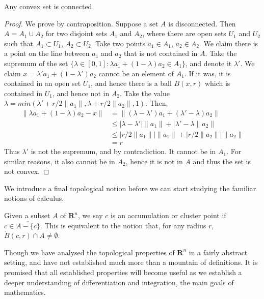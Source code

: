 \begin{theorem}
  Any convex set is connected.
\end{theorem}
\begin{proof}
  We prove by contraposition. Suppose a set $A$ is disconnected. Then $A = A_1 \cup A_2$ for two disjoint sets $A_1$ and $A_2$, where there are open sets $U_1$ and $U_2$ such that $A_1 \subset U_1$, $A_2 \subset U_2$. Take two points $a_1 \in A_1$, $a_2 \in A_2$. We claim there is a point on the line between $a_1$ and $a_2$ that is not contained in $A$. Take the supremum of the set $\{ \lambda \in [0,1] : \lambda a_1 + (1 - \lambda) a_2 \in A_1 \}$, and denote it $\lambda'$. We claim $x = \lambda' a_1 + (1 - \lambda') a_2$ cannot be an element of $A_1$. If it was, it is contained in an open set $U_1$, and hence there is a ball $B(x,r)$ which is contained in $U_1$, and hence not in $A_2$. Take the value $\lambda = min(\lambda' + r/2\|a_1\|, \lambda + r/2\|a_2\|, 1)$. Then,
  \begin{align*}
  \| \lambda a_1 + (1 - \lambda) a_2 - x \| &= \| (\lambda - \lambda') a_1 + (\lambda' - \lambda) a_2 \|\\
      &\leq |\lambda - \lambda'| \| a_1 \| + |\lambda' - \lambda \|a_2\|\\
      &\leq |r/2\|a_1\|| \|a_1\| + |r/2\|a_2\|| \|a_2\|\\
      &= r
  \end{align*}
  Thus $\lambda'$ is not the supremum, and by contradiction. It cannot be in $A_1$. For similar reasons, it also cannot be in $A_2$, hence it is not in $A$ and thus the set is not convex.
\end{proof}

We introduce a final topological notion before we can start studying the familiar notions of calculus.

\begin{definition}
  Given a subset $A$ of $\mathbf{R}^n$, we say $c$ is an accumulation or cluster point if $c \in \overline{A - \{c\}}$. This is equivalent to the notion that, for any radius $r$, $\mathring{B}(c,r) \cap A \neq \emptyset$.
\end{definition}

Though we have analysed the topological properties of $\mathbf{R}^n$ in a fairly abstract setting, and have not established much more than a mountain of definitions. It is promised that all established properties will become useful as we establish a deeper understanding of differentiation and integration, the main goals of mathematics.





